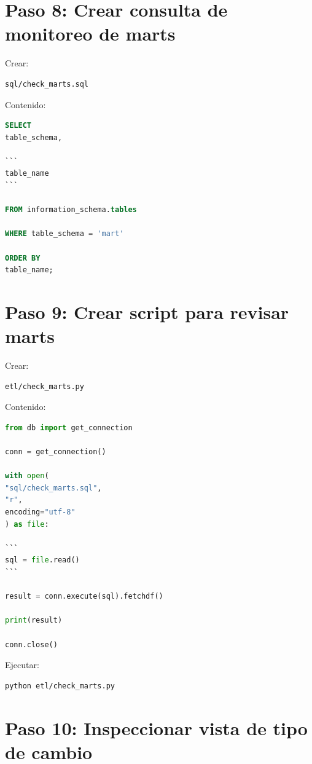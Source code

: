 \section{Paso 8: Crear consulta de monitoreo de marts}

Crear:

\begin{verbatim}
sql/check_marts.sql
\end{verbatim}

Contenido:

\begin{lstlisting}[language=SQL]
SELECT
table_schema,

```
table_name
```

FROM information_schema.tables

WHERE table_schema = 'mart'

ORDER BY
table_name;
\end{lstlisting}

\section{Paso 9: Crear script para revisar marts}

Crear:

\begin{verbatim}
etl/check_marts.py
\end{verbatim}

Contenido:

\begin{lstlisting}[language=Python]
from db import get_connection

conn = get_connection()

with open(
"sql/check_marts.sql",
"r",
encoding="utf-8"
) as file:

```
sql = file.read()
```

result = conn.execute(sql).fetchdf()

print(result)

conn.close()
\end{lstlisting}

Ejecutar:

\begin{lstlisting}[language=bash]
python etl/check_marts.py
\end{lstlisting}

\section{Paso 10: Inspeccionar vista de tipo de cambio}

